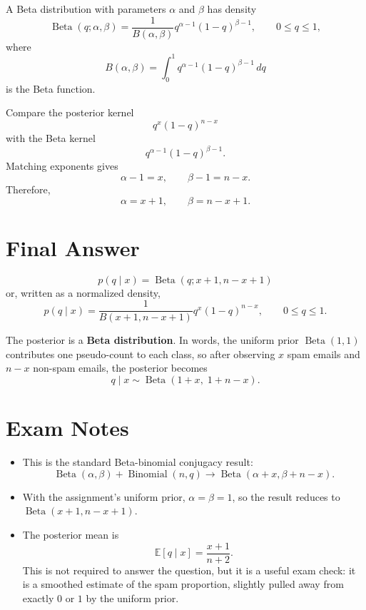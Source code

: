 \documentclass[11pt]{article}
\begin{document}
A Beta distribution with parameters \(\alpha\) and \(\beta\) has density
\[
    \operatorname{Beta}(q;\alpha,\beta)
    =
    \frac{1}{B(\alpha,\beta)}
    q^{\alpha-1}(1-q)^{\beta-1},
    \qquad 0 \le q \le 1,
\]
where
\[
    B(\alpha,\beta)
    =
    \int_0^1 q^{\alpha-1}(1-q)^{\beta-1}\,dq
\]
is the Beta function.

Compare the posterior kernel
\[
    q^x(1-q)^{n-x}
\]
with the Beta kernel
\[
    q^{\alpha-1}(1-q)^{\beta-1}.
\]
Matching exponents gives
\[
    \alpha - 1 = x,
    \qquad
    \beta - 1 = n-x.
\]
Therefore,
\[
    \alpha = x+1,
    \qquad
    \beta = n-x+1.
\]

\section*{Final Answer}

\[
    \boxed{
    p(q \mid x)
    =
    \operatorname{Beta}(q; x+1, n-x+1)
    }
\]
or, written as a normalized density,
\[
    \boxed{
    p(q \mid x)
    =
    \frac{1}{B(x+1,n-x+1)}
    q^x(1-q)^{n-x},
    \qquad 0 \le q \le 1.
    }
\]

The posterior is a \textbf{Beta distribution}. In words, the uniform prior
\(\operatorname{Beta}(1,1)\) contributes one pseudo-count to each class, so after
observing \(x\) spam emails and \(n-x\) non-spam emails, the posterior becomes
\[
    q \mid x \sim \operatorname{Beta}(1+x,\;1+n-x).
\]

\section*{Exam Notes}

\begin{itemize}
    \item This is the standard Beta-binomial conjugacy result:
    \[
        \operatorname{Beta}(\alpha,\beta)
        + \operatorname{Binomial}(n,q)
        \rightarrow
        \operatorname{Beta}(\alpha+x,\beta+n-x).
    \]
    \item With the assignment's uniform prior, \(\alpha=\beta=1\), so the result
    reduces to \(\operatorname{Beta}(x+1,n-x+1)\).
    \item The posterior mean is
    \[
        \mathbb{E}[q \mid x]
        =
        \frac{x+1}{n+2}.
    \]
    This is not required to answer the question, but it is a useful exam check:
    it is a smoothed estimate of the spam proportion, slightly pulled away from
    exactly \(0\) or \(1\) by the uniform prior.
\end{itemize}
\end{document}

